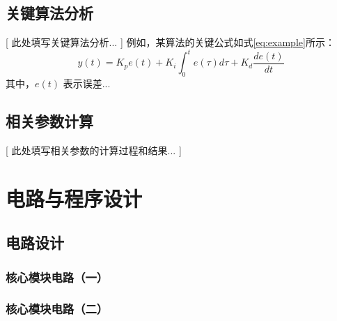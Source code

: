 \documentclass[zihao=-4,fontset=none]{ctexart}
\begin{document}
\subsection{关键算法分析}
    [ 此处填写关键算法分析... ]
    例如，某算法的关键公式如式\ref{eq:example}所示：
    \begin{equation} \label{eq:example}
        y(t) = K_p e(t) + K_i \int_0^t e(\tau)d\tau + K_d \frac{de(t)}{dt}
    \end{equation}
    其中，$e(t)$ 表示误差... %

\subsection{相关参数计算}
    [ 此处填写相关参数的计算过程和结果... ]
    
\section{电路与程序设计}
\subsection{电路设计}
\subsubsection{核心模块电路（一）}
    
\subsubsection{核心模块电路（二）}
\end{document}
